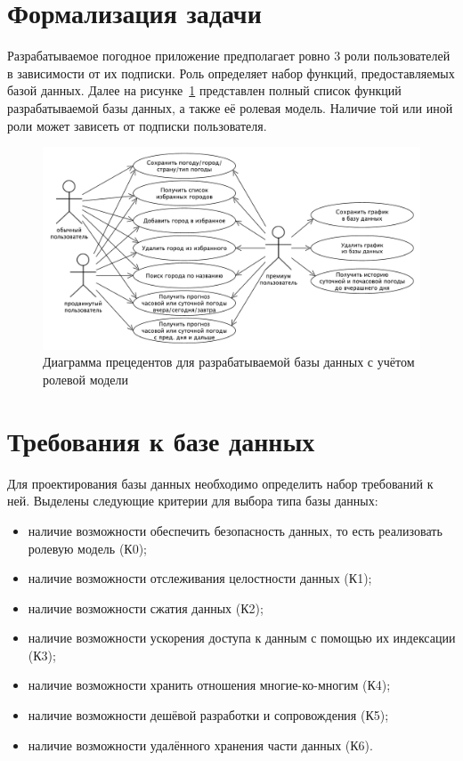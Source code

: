 \section{Формализация задачи}
Разрабатываемое погодное приложение предполагает ровно $3$ роли пользователей в зависимости от их подписки.
Роль определяет набор функций, предоставляемых базой данных.
Далее на рисунке~\ref{fig:use-case} представлен полный список функций разрабатываемой базы данных, а также её ролевая модель.
Наличие той или иной роли может зависеть от подписки пользователя.

\begin{figure}[H]
	\centering
	\includegraphics[width=\textwidth]{tools/img/db_usecase.pdf}
	\caption{
        Диаграмма прецедентов для разрабатываемой базы данных с учётом ролевой модели
    }
	\label{fig:use-case}
\end{figure}


\section{Требования к базе данных}
Для проектирования базы данных необходимо определить набор требований к ней.
Выделены следующие критерии для выбора типа базы данных:
\begin{itemize}
    \item наличие возможности обеспечить безопасность данных, то есть реализовать ролевую модель (К0);
    \item наличие возможности отслеживания целостности данных (К1);
    \item наличие возможности сжатия данных (К2);
    \item наличие возможности ускорения доступа к данным с помощью их индексации (К3);
    \item наличие возможности хранить отношения многие-ко-многим (К4);
    \item наличие возможности дешёвой разработки и сопровождения (К5);
    \item наличие возможности удалённого хранения части данных (К6).
\end{itemize}

